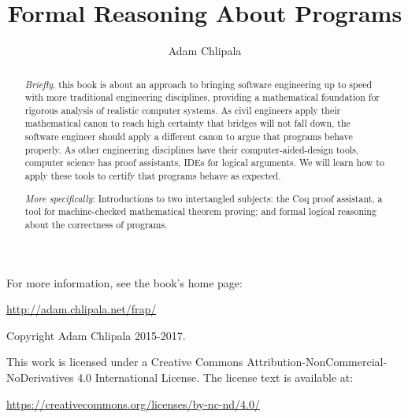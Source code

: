 \documentclass{amsbook}
\theoremstyle{definition}
\theoremstyle{remark}
\numberwithin{section}{chapter}
\numberwithin{equation}{chapter}
\begin{document}
\frontmatter

\title{Formal Reasoning About Programs}

\author{Adam Chlipala}
\address{MIT, Cambridge, MA, USA}

\begin{abstract}
  \emph{Briefly}, this book is about an approach to bringing software engineering up to speed with more traditional engineering disciplines, providing a mathematical foundation for rigorous analysis of realistic computer systems. As civil engineers apply their mathematical canon to reach high certainty that bridges will not fall down, the software engineer should apply a different canon to argue that programs behave properly. As other engineering disciplines have their computer-aided-design tools, computer science has proof assistants, IDEs for logical arguments. We will learn how to apply these tools to certify that programs behave as expected.

  \emph{More specifically}: Introductions to two intertangled subjects: the Coq proof assistant, a tool for machine-checked mathematical theorem proving; and formal logical reasoning about the correctness of programs.
\end{abstract}

\maketitle

\newpage

For more information, see the book's home page:

\begin{center} \url{http://adam.chlipala.net/frap/} \end{center}

\thispagestyle{empty}
\mbox{}\vfill
\begin{center}

Copyright Adam Chlipala 2015-2017.


This work is licensed under a
Creative Commons Attribution-NonCommercial-NoDerivatives 4.0 International License.
The license text is available at:

\end{center}

\begin{center} \url{https://creativecommons.org/licenses/by-nc-nd/4.0/} \end{center}

\newpage
\end{document}
